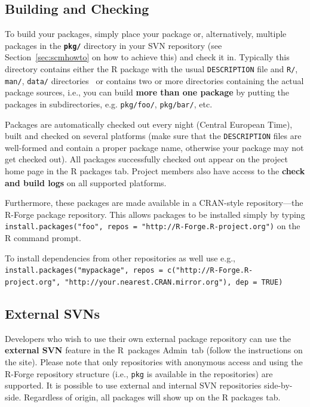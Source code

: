 \documentclass[a4paper]{article}
\let\code=\texttt
\newcommand{\proglang}[1]{\textsf{#1}}
\begin{document}
\subsection{Building and Checking}
To build your packages, simply place your package or, alternatively,
multiple packages in the \textbf{\texttt{pkg/}} directory in your SVN
repository (see Section~\ref{sec:scmhowto} on how to achieve this) and
check it in. Typically this directory contains either the \proglang{R}
package with the usual \texttt{DESCRIPTION} file and \texttt{R/},
\texttt{man/}, \texttt{data/} directories~\citep[see][for more
details]{Rcore:writing_R_extensions} or contains two or more
directories containing the actual package sources, i.e., you can build
\textbf{more than one package} by putting the packages in
subdirectories, e.g. \texttt{pkg/foo/}, \texttt{pkg/bar/}, etc.

Packages are automatically checked out every night (Central European
Time), built and checked on several platforms (make sure that the
\texttt{DESCRIPTION} files are well-formed and contain a proper 
package name, otherwise your package may not get checked out). All
packages successfully checked out appear on the project home page in
the \proglang{R} packages tab. Project members also have access to the
\textbf{check and build logs} on all supported platforms.  

Furthermore, these packages are made available in a CRAN-style
repository---the
\proglang{R}-Forge package repository. This allows packages to be installed simply by
typing \texttt{install.packages("foo", repos = "http://R-Forge.R-project.org")}
on the \proglang{R} command prompt. 

To install dependencies from other repositories as well use e.g.,
\code{install.packages("mypackage", repos = c("http://R-Forge.R-project.org",
"http://your.nearest.CRAN.mirror.org"), dep = TRUE)}

\subsection{External SVNs}
Developers who wish to use their own external package repository can
use the \textbf{external SVN} feature in the \proglang{R}~packages
Admin~tab (follow the instructions on the site). Please note that only
repositories with anonymous access and using the \proglang{R}-Forge
repository structure (i.e., \texttt{pkg} is available in the
repositories) are supported. It is possible to use external and
internal SVN repositories side-by-side. Regardless of origin, all
packages will show up on the \proglang{R} packages tab.
\end{document}
